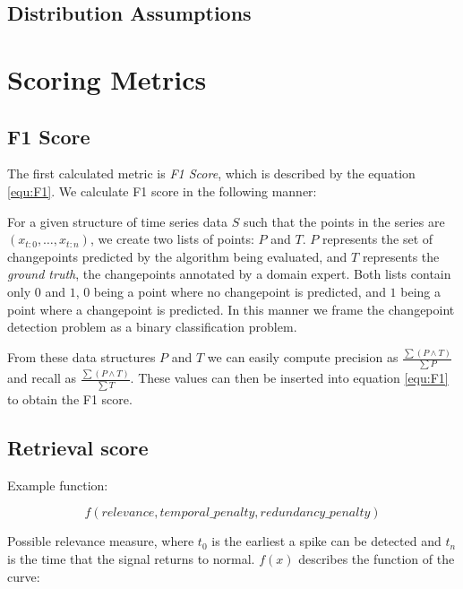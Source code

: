 \documentclass{uvamscse}	%
\begin{document}
\subsection{Distribution Assumptions}

\section{Scoring Metrics}

\subsection{F1 Score}

The first calculated metric is \emph{F1 Score}, which is described by the equation \ref{equ:F1}. We calculate F1 score in the following manner:

For a given structure of time series data $S$ such that the points in the series are $(x_{t:0},\ldots,x_{t:n})$, we create two lists of points: $P$ and $T$. $P$ represents the set of changepoints predicted by the algorithm being evaluated, and $T$ represents the \emph{ground truth}, the changepoints annotated by a domain expert. Both lists contain only $0$ and $1$, $0$ being a point where no changepoint is predicted, and $1$ being a point where a changepoint is predicted. In this manner we frame the changepoint detection problem as a binary classification problem.

From these data structures $P$ and $T$ we can easily compute precision as $\frac{\sum (P \wedge T) }{\sum P}$ and recall as $\frac{\sum (P \wedge T)}{\sum T}$. These values can then be inserted into equation \ref{equ:F1} to obtain the F1 score.

\subsection{Retrieval score}

Example function:

\begin{equation}
	f(relevance, temporal\_penalty, redundancy\_penalty)
\end{equation}


Possible relevance measure, where $t_0$ is the earliest a spike can be detected and $t_n$ is the time that the signal returns to normal. $f(x)$ describes the function of the curve:
\end{document}

